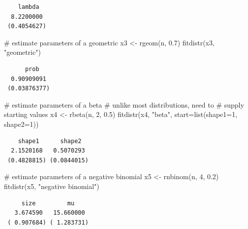 \documentclass[
  13,
  letterpaper,
]{report}
\newenvironment{Shaded}{\begin{snugshade}}{\end{snugshade}}
\newcommand{\AttributeTok}[1]{\textcolor[rgb]{0.40,0.45,0.13}{#1}}
\newcommand{\CommentTok}[1]{\textcolor[rgb]{0.37,0.37,0.37}{#1}}
\newcommand{\DecValTok}[1]{\textcolor[rgb]{0.68,0.00,0.00}{#1}}
\newcommand{\FloatTok}[1]{\textcolor[rgb]{0.68,0.00,0.00}{#1}}
\newcommand{\FunctionTok}[1]{\textcolor[rgb]{0.28,0.35,0.67}{#1}}
\newcommand{\NormalTok}[1]{\textcolor[rgb]{0.00,0.23,0.31}{#1}}
\newcommand{\OtherTok}[1]{\textcolor[rgb]{0.00,0.23,0.31}{#1}}
\newcommand{\StringTok}[1]{\textcolor[rgb]{0.13,0.47,0.30}{#1}}
\begin{document}
\begin{verbatim}
    lambda  
  8.2200000 
 (0.4054627)
\end{verbatim}

\begin{Shaded}
\begin{Highlighting}[]
\CommentTok{\# estimate parameters of a geometric}
\NormalTok{x3 }\OtherTok{\textless{}{-}} \FunctionTok{rgeom}\NormalTok{(n, }\FloatTok{0.7}\NormalTok{)}
\FunctionTok{fitdistr}\NormalTok{(x3, }\StringTok{"geometric"}\NormalTok{)}
\end{Highlighting}
\end{Shaded}

\begin{verbatim}
      prob   
  0.90909091 
 (0.03876377)
\end{verbatim}

\begin{Shaded}
\begin{Highlighting}[]
\CommentTok{\# estimate parameters of a beta}
\CommentTok{\# unlike most distributions, need to }
\CommentTok{\# supply starting values}
\NormalTok{x4 }\OtherTok{\textless{}{-}} \FunctionTok{rbeta}\NormalTok{(n, }\DecValTok{2}\NormalTok{, }\FloatTok{0.5}\NormalTok{)}
\FunctionTok{fitdistr}\NormalTok{(x4, }\StringTok{"beta"}\NormalTok{, }\AttributeTok{start=}\FunctionTok{list}\NormalTok{(}\AttributeTok{shape1=}\DecValTok{1}\NormalTok{, }\AttributeTok{shape2=}\DecValTok{1}\NormalTok{))}
\end{Highlighting}
\end{Shaded}

\begin{verbatim}
    shape1      shape2  
  2.1520168   0.5070293 
 (0.4828815) (0.0844015)
\end{verbatim}

\begin{Shaded}
\begin{Highlighting}[]
\CommentTok{\# estimate parameters of a negative binomial}
\NormalTok{x5 }\OtherTok{\textless{}{-}} \FunctionTok{rnbinom}\NormalTok{(n, }\DecValTok{4}\NormalTok{, }\FloatTok{0.2}\NormalTok{)}
\FunctionTok{fitdistr}\NormalTok{(x5, }\StringTok{"negative binomial"}\NormalTok{)}
\end{Highlighting}
\end{Shaded}

\begin{verbatim}
     size         mu    
   3.674590   15.660000 
 ( 0.907684) ( 1.283731)
\end{verbatim}
\end{document}
